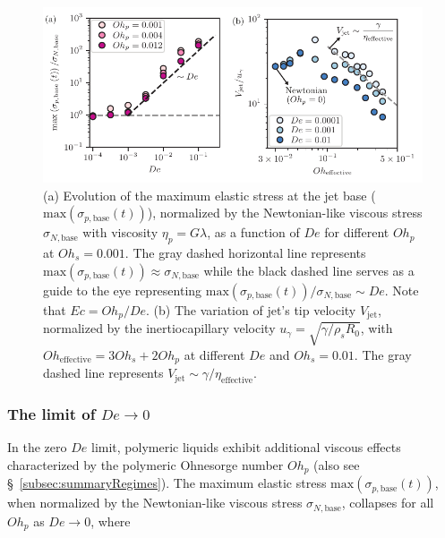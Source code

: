 \documentclass{jfm}
\newcommand{\oo}{\color{black} \normalfont}
\newcommand{\bb}{\color{black} \normalfont}
\begin{document}
\begin{figure}
	\centering
	\includegraphics[width=\textwidth]{Stress_De-r_05-eps-converted-to.pdf}
	\caption{(a) Evolution of the maximum elastic stress at the jet base ($\text{max}\left(\sigma_{p,\text{base}}(t)\right)$), normalized by the Newtonian-like viscous stress $\sigma_{N,\text{base}}$ with viscosity $\eta_{p} = G\lambda$, as a function of $De$ for different $Oh_p$ at $Oh_s = 0.001$. The gray dashed horizontal line represents $\text{max}\left(\sigma_{p,\text{base}}(t)\right) \approx \sigma_{N,\text{base}}$ while the black dashed line serves as a guide to the eye representing $\text{max}\left(\sigma_{p,\text{base}}(t)\right)/\sigma_{N,\text{base}} \sim De$. {\oo Note that $Ec = Oh_p/De$. \bb} (b) The variation of jet's tip velocity $V_{\text{jet}}$, normalized by the inertiocapillary velocity $u_\gamma = \sqrt{\gamma/\rho_sR_0}$, with $Oh_{\text{effective}} = 3Oh_s + 2 Oh_p$ at different $De$ and $Oh_s = 0.01$. The gray dashed line represents $V_{\text{jet}} \sim \gamma/\eta_{\text{effective}}$.}
	\label{stressratio_De}
\end{figure}

\subsubsection{The limit of $De \to 0$}

\oo
In the zero $De$ limit, polymeric liquids exhibit additional viscous effects characterized by the polymeric Ohnesorge number $Oh_p$ (also see \S~\ref{subsec:summaryRegimes}).
The maximum elastic stress $\text{max}(\sigma_{p,\text{base}}(t))$, when normalized by the Newtonian-like viscous stress $\sigma_{N,\text{base}}$, collapses for all $Oh_p$ as $De \to 0$, where
\bb
%
\end{document}
